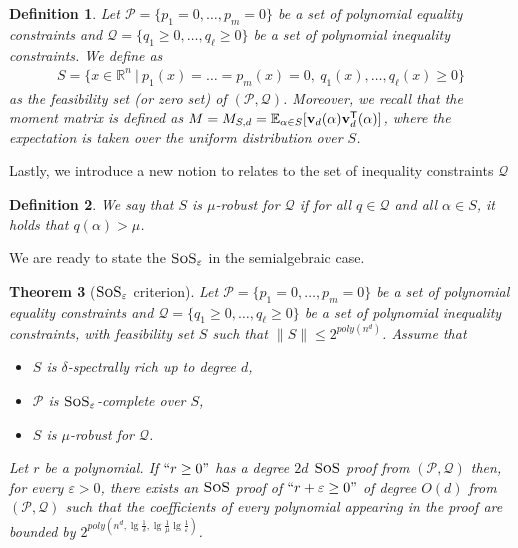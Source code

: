 \documentclass[11pt]{article}
\newcommand{\sos}{\text{\sc{SoS}}}
\newcommand{\1}{\textbf{1}}
\newtheorem{theorem}{Theorem}[section]
\newtheorem{definition}[theorem]{Definition}
\begin{document}
\begin{definition}
    Let $\mathcal{P} = \{p_1=0,\ldots,p_m=0\}$ be a set of polynomial equality constraints and $\mathcal{Q} = \{q_1 \geq 0, \ldots, q_\ell \geq 0\}$ be a set of polynomial inequality constraints. We define as
    \begin{align*}
        S = \{x \in \mathbb{R}^n \ | \ p_1(x) = \ldots = p_m(x) =0, \ q_1(x), \ldots, q_\ell(x) \geq 0\}
    \end{align*}
    as the \emph{feasibility set} (or \emph{zero set}) of $(\mathcal{P}, \mathcal{Q})$. Moreover, we recall that the moment matrix is defined as $M = M_{S,d} = \mathbb{E}_{\alpha \in S}[\mathbf{v}_d(\alpha) \mathbf{v}_d^{\sf{T}}(\alpha)]$, where the expectation is taken over the uniform distribution over $S$.
\end{definition}

Lastly, we introduce a new notion to relates to the set of inequality constraints $\mathcal{Q}$

\begin{definition}
    We say that $S$ is $\mu$-robust for $\mathcal{Q}$ if for all $q \in \mathcal{Q}$ and all $\alpha \in S$, it holds that $q(\alpha) > \mu$. 
\end{definition}

We are ready to state the $\sos_{\varepsilon}$ in the semialgebraic case.

\begin{theorem}[$\sos_{\varepsilon}$ criterion]\label{th:SoS_Criterion_semialgebraic}
    Let $\mathcal{P} = \{p_1=0,\ldots,p_m=0\}$ be a set of polynomial equality constraints and $\mathcal{Q} = \{q_1 \geq 0, \ldots, q_\ell \geq 0\}$ be a set of polynomial inequality constraints, with feasibility set $S$ such that $\| S \| \leq 2^{poly(n^d)}$.
    Assume that
    \begin{itemize}
        \item [1)] $S$ is $\delta$-spectrally rich up to degree $d$, 
        \item [2)] $\mathcal{P}$ is $\sos_\varepsilon$-complete over $S$,
        \item [3)] $S$ is $\mu$-robust for $\mathcal{Q}$.
    \end{itemize}
    Let $r$ be a polynomial. If $``r \geq 0"$ has a degree $2d$ $\sos$ proof from $(\mathcal{P}, \mathcal{Q})$
    then, for every $\varepsilon>0$, there exists an $\sos$ proof of $``r+\varepsilon \geq 0"$ of degree $O(d)$ from $(\mathcal{P}, \mathcal{Q})$
    such that the coefficients of every polynomial appearing in the proof are bounded by $2^{poly(n^d, \lg \frac{1}{\delta}, \lg \frac{1}{\mu} \lg \frac{1}{\varepsilon})}$.
\end{theorem}
\end{document}
